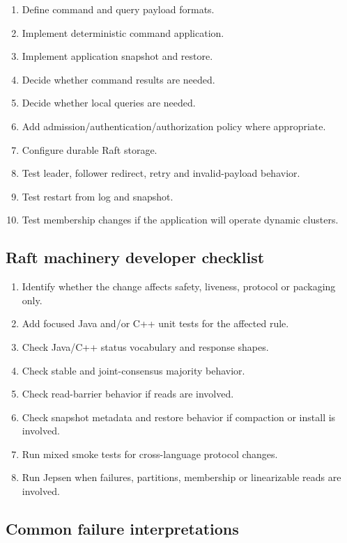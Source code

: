 \begin{enumerate}
\item Define command and query payload formats.
\item Implement deterministic command application.
\item Implement application snapshot and restore.
\item Decide whether command results are needed.
\item Decide whether local queries are needed.
\item Add admission/authentication/authorization policy where appropriate.
\item Configure durable Raft storage.
\item Test leader, follower redirect, retry and invalid-payload behavior.
\item Test restart from log and snapshot.
\item Test membership changes if the application will operate dynamic clusters.
\end{enumerate}

\subsection{Raft machinery developer checklist}

\begin{enumerate}
\item Identify whether the change affects safety, liveness, protocol or packaging only.
\item Add focused Java and/or C++ unit tests for the affected rule.
\item Check Java/C++ status vocabulary and response shapes.
\item Check stable and joint-consensus majority behavior.
\item Check read-barrier behavior if reads are involved.
\item Check snapshot metadata and restore behavior if compaction or install is involved.
\item Run mixed smoke tests for cross-language protocol changes.
\item Run Jepsen when failures, partitions, membership or linearizable reads are involved.
\end{enumerate}

\subsection{Common failure interpretations}

